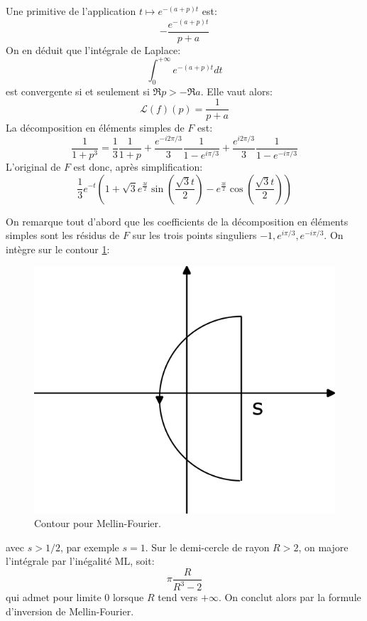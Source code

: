 \documentclass[a4paper, 12pt]{amsart}
\begin{document}
Une primitive de l'application $t \mapsto e^{-(a+p)t}$ est:
\[
-\frac{e^{-(a+p)t}}{p+a}
\]
On en déduit que l'intégrale de Laplace:
\[
\int_0^{+\infty} e^{-(a+p)t} dt
\]
est convergente si et seulement si $\Re{p}> -\Re{a}.$
Elle vaut alors:
\[
\mathcal{L}(f)(p) = \frac{1}{p+a}
\]
La décomposition en éléments simples de $F$ est:
\[
\frac{1}{1+p^3} = \frac{1}{3} \frac{1}{1+p}
+\frac{e^{-i 2 \pi /3}}{3}\frac{1}{1-e^{i\pi /3}} 
+\frac{e^{i 2 \pi /3}}{3}\frac{1}{1-e^{-i \pi /3}}
\]
L'original de $F$ est donc, après simplification:
\[
\frac{1}{3} e^{-t} \left(1+\sqrt{3} e^{\frac{3 t}{2}} \sin \left(\frac{\sqrt{3} t}{2}\right) -e^{\frac{3 t}{2}} \cos \left(\frac{\sqrt{3} t}{2}\right)\right)
\]

On remarque tout d'abord que les coefficients de la décomposition en éléments simples sont les résidus de $F$ sur les trois points singuliers $-1,e^{i \pi/3},e^{-i \pi /3}.$ On intègre sur le contour \ref{fig:contour_laplace}:
\begin{figure}
    \centering
    \includegraphics{images/contour_laplace.png}
    \caption{Contour pour Mellin-Fourier.}
    \label{fig:contour_laplace}
\end{figure}
avec $s > 1/2$, par exemple $s=1.$
Sur le demi-cercle de rayon $R > 2$, on majore l'intégrale par l'inégalité ML, soit:
\[
\pi \frac{R}{R^3-2} 
\]
qui admet pour limite $0$ lorsque $R$ tend vers $+\infty$.
On conclut alors par la formule d'inversion de Mellin-Fourier.
\end{document}
